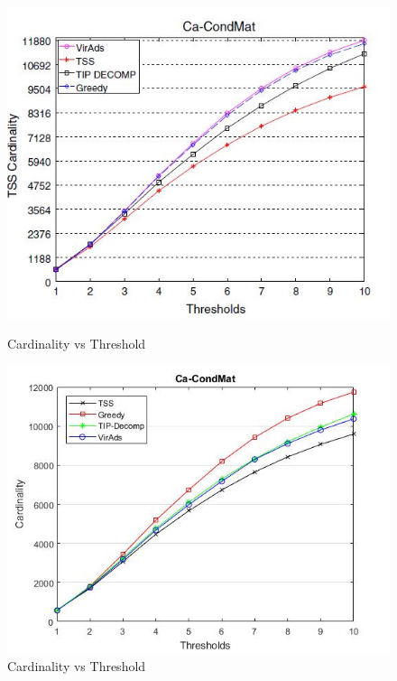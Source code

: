 \begin{figure}[h!]
\begin{minipage}[t]{0.50\textwidth}
\includegraphics[width=\linewidth,keepaspectratio=true]{images/ca-condmatpaper.jpg}
\caption{Cardinality vs Threshold}
\label{fase1}
\end{minipage}
\begin{minipage}[t]{0.50\textwidth}
\includegraphics[width=\linewidth,keepaspectratio=true]{images/ca-condmatresult.jpg}
\caption{Cardinality vs Threshold}
\end{minipage}
\end{figure}

